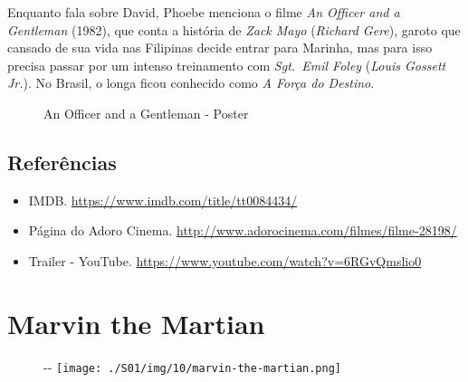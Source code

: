 Enquanto fala sobre David, Phoebe menciona o filme \emph{An Officer and
a Gentleman} (1982), que conta a história de \emph{Zack Mayo}
(\emph{Richard Gere}), garoto que cansado de sua vida nas Filipinas
decide entrar para Marinha, mas para isso precisa passar por um intenso
treinamento com \emph{Sgt.~Emil Foley} (\emph{Louis Gossett Jr.}). No
Brasil, o longa ficou conhecido como \emph{A Força do Destino}.

\begin{figure}
  \centering
    \caption{An Officer and a Gentleman - Poster\label{fig:an-officer-and-a-gentleman-poster}}
\end{figure}

\hypertarget{referuxeancias-1}{%
\subsection{Referências}\label{referuxeancias-1}}

\begin{itemize}
\tightlist
\item
  \sloppy IMDB. \url{https://www.imdb.com/title/tt0084434/}
\item
  \sloppy Página do Adoro Cinema. \url{http://www.adorocinema.com/filmes/filme-28198/}
\item
  \sloppy Trailer - YouTube. \url{https://www.youtube.com/watch?v=6RGvQmslio0}
\end{itemize}

\hypertarget{marvin-the-martian}{%
\section{Marvin the Martian}\label{marvin-the-martian}}

\begin{figure}[!ht]
  \begin{adjustwidth}{-\oddsidemargin-1in}{-\rightmargin}
    \centering
    \texttt{[image: ./S01/img/10/marvin-the-martian.png]}
  \end{adjustwidth}
\end{figure}

